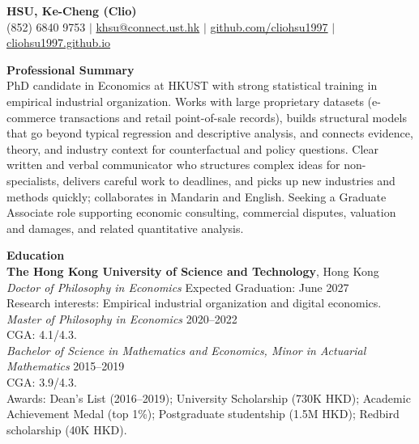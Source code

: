 \documentclass[11pt,letterpaper]{article}
\begin{document}
{\Large \textbf{HSU, Ke-Cheng (Clio)}}\\[1pt]
(852) 6840 9753 \quad $|$ \quad \href{mailto:khsu@connect.ust.hk}{khsu@connect.ust.hk} \quad $|$ \quad \href{https://github.com/cliohsu1997}{github.com/cliohsu1997} \quad $|$ \quad \href{https://cliohsu1997.github.io/}{cliohsu1997.github.io}

\vspace{0.15pt}

{\large \textbf{Professional Summary}}\\[-0.5pt]
PhD candidate in Economics at HKUST with strong statistical training in empirical industrial organization. Works with large proprietary datasets (e-commerce transactions and retail point-of-sale records), builds structural models that go beyond typical regression and descriptive analysis, and connects evidence, theory, and industry context for counterfactual and policy questions. Clear written and verbal communicator who structures complex ideas for non-specialists, delivers careful work to deadlines, and picks up new industries and methods quickly; collaborates in Mandarin and English. Seeking a Graduate Associate role supporting economic consulting, commercial disputes, valuation and damages, and related quantitative analysis.

\vspace{0.15pt}

{\large \textbf{Education}}\\[-0.5pt]
\textbf{The Hong Kong University of Science and Technology}, Hong Kong\\
\textit{Doctor of Philosophy in Economics} \hfill Expected Graduation: June 2027\\
Research interests: Empirical industrial organization and digital economics.\\
\textit{Master of Philosophy in Economics} \hfill 2020--2022\\
CGA: 4.1/4.3.\\
\textit{Bachelor of Science in Mathematics and Economics, Minor in Actuarial Mathematics} \hfill 2015--2019\\
CGA: 3.9/4.3.\\
Awards: Dean's List (2016--2019); University Scholarship (730K HKD); Academic Achievement Medal (top 1\%); Postgraduate studentship (1.5M HKD); Redbird scholarship (40K HKD).

\vspace{0.15pt}
\end{document}
